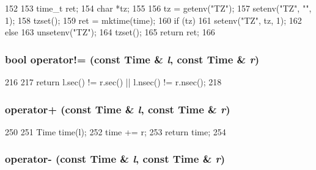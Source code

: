 \begin{DoxyCode}
152 {
153     time_t ret;
154     char *tz;
155 
156     tz = getenv("TZ");
157     setenv("TZ", "", 1);
158     tzset();
159     ret = mktime(time);
160     if (tz)
161         setenv("TZ", tz, 1);
162     else
163         unsetenv("TZ");
164     tzset();
165     return ret;
166 }
\end{DoxyCode}
\hypertarget{time_8hh_a26a6da5d3524e669148b5080788626ee}{
\subsubsection[{operator!=}]{\setlength{\rightskip}{0pt plus 5cm}bool operator!= (const {\bf Time} \& {\em l}, \/  const {\bf Time} \& {\em r})}}
\label{time_8hh_a26a6da5d3524e669148b5080788626ee}



\begin{DoxyCode}
216 {
217     return l.sec() != r.sec() || l.nsec() != r.nsec();
218 }
\end{DoxyCode}
\hypertarget{time_8hh_a9b60749d49d8826edb60cdbae4d22ed6}{
\subsubsection[{operator+}]{ operator+ (const {\bf Time} \& {\em l}, \/  const {\bf Time} \& {\em r})}}
\label{time_8hh_a9b60749d49d8826edb60cdbae4d22ed6}



\begin{DoxyCode}
250 {
251     Time time(l);
252     time += r;
253     return time;
254 }
\end{DoxyCode}
\hypertarget{time_8hh_a79263cff29339de9e0808c5f2393b412}{
\subsubsection[{operator-\/}]{ operator-\/ (const {\bf Time} \& {\em l}, \/  const {\bf Time} \& {\em r})}}
\label{time_8hh_a79263cff29339de9e0808c5f2393b412}



